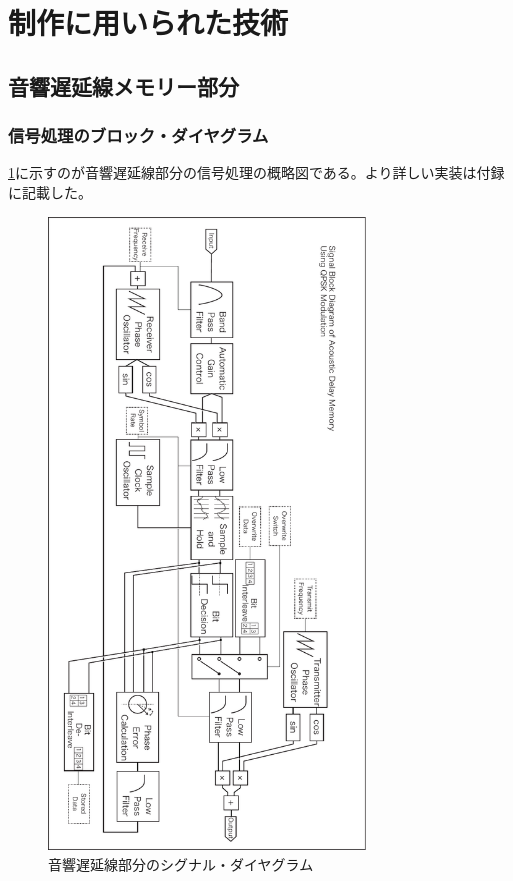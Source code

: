 \documentclass[a4paper,report]{jsbook}
\begin{document}
\section{制作に用いられた技術}\label{ux5236ux4f5cux306bux7528ux3044ux3089ux308cux305fux6280ux8853}

\subsection{音響遅延線メモリー部分}\label{ux97f3ux97ffux9045ux5ef6ux7ddaux30e1ux30e2ux30eaux30fcux90e8ux5206}

\subsubsection{信号処理のブロック・ダイヤグラム}\label{ux4fe1ux53f7ux51e6ux7406ux306eux30d6ux30edux30c3ux30afux30c0ux30a4ux30e4ux30b0ux30e9ux30e0}

\cref{fig:adm2diagram}に示すのが音響遅延線部分の信号処理の概略図である。より詳しい実装は付録に記載した。

\begin{figure}[htbp]
\centering
\includegraphics[width=0.75000\textwidth]{./img/adm2_diagram.pdf}
\caption{音響遅延線部分のシグナル・ダイヤグラム\label{fig:adm2diagram}}
\end{figure}
\end{document}

